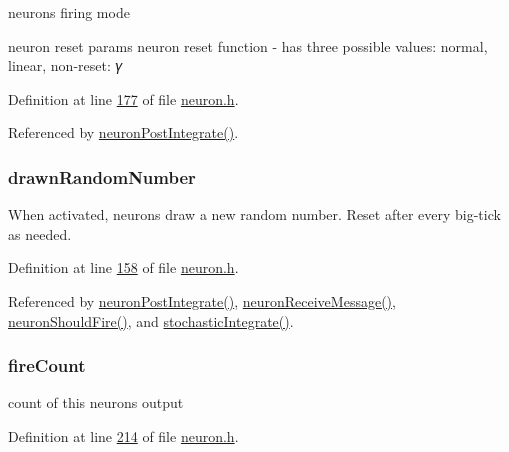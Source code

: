neuron\textquotesingle{}s firing mode 

neuron reset params neuron reset function -\/ has three possible values\+: normal, linear, non-\/reset\+: 𝛾 

Definition at line \hyperlink{neuron_8h_source_l00177}{177} of file \hyperlink{neuron_8h_source}{neuron.\+h}.



Referenced by \hyperlink{neuron_8c_source_l00214}{neuron\+Post\+Integrate()}.

\hypertarget{structneuron_state_a296a4f04813c4882d6acd8c9074abd35}{}
\subsubsection[{drawn\+Random\+Number}]{ drawn\+Random\+Number}\label{structneuron_state_a296a4f04813c4882d6acd8c9074abd35}


When activated, neurons draw a new random number. Reset after every big-\/tick as needed. 



Definition at line \hyperlink{neuron_8h_source_l00158}{158} of file \hyperlink{neuron_8h_source}{neuron.\+h}.



Referenced by \hyperlink{neuron_8c_source_l00214}{neuron\+Post\+Integrate()}, \hyperlink{neuron_8c_source_l00103}{neuron\+Receive\+Message()}, \hyperlink{neuron_8c_source_l00161}{neuron\+Should\+Fire()}, and \hyperlink{neuron_8c_source_l00191}{stochastic\+Integrate()}.

\hypertarget{structneuron_state_afe8825076c4cf3863c677307fec63c61}{}
\subsubsection[{fire\+Count}]{ fire\+Count}\label{structneuron_state_afe8825076c4cf3863c677307fec63c61}


count of this neuron\textquotesingle{}s output 



Definition at line \hyperlink{neuron_8h_source_l00214}{214} of file \hyperlink{neuron_8h_source}{neuron.\+h}.



